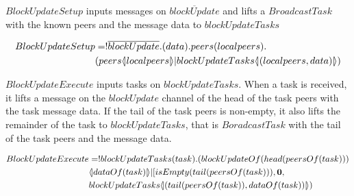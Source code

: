 $BlockUpdateSetup$ inputs messages on $\overline{blockUpdate}$ and lifts a $BroadcastTask$ with the known peers and the message data to $blockUpdateTasks$

\begin{align*}
	BlockUpdateSetup &= !\overline{blockUpdate}.(data).peers(localpeers).\\
	&(peers \langle \! | localpeers | \! \rangle|blockUpdateTasks \langle \! | (localpeers,data) | \! \rangle)
\end{align*}

$BlockUpdateExecute$ inputs tasks on $blockUpdateTasks$. When a task is received, it lifts a message on the $blockUpdate$ channel of the head of the task peers with the task message data. If the tail of the task peers is non-empty, it also lifts the remainder of the task to $blockUpdateTasks$, that is $BoradcastTask$ with the tail of the task peers and the message data.

\begin{align*}
	BlockUpdateExecute &= !blockUpdateTasks(task).(blockUpdateOf(head(peersOf(task)))\\
	& \langle \! | dataOf(task) | \! \rangle|[isEmpty(tail(peersOf(task))),\mathbf{0},\\
	&blockUpdateTasks \langle \! | (tail(peersOf(task)),dataOf(task)) | \! \rangle)
\end{align*}